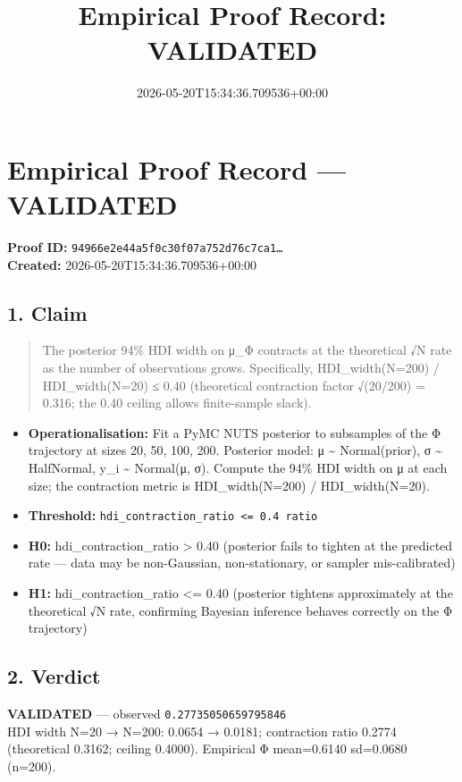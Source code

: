 \documentclass{article}
\title{Empirical Proof Record: VALIDATED}
\date{2026-05-20T15:34:36.709536+00:00}
\begin{document}
\maketitle
\section*{Empirical Proof Record --- \textcolor{validated}{\textbf{VALIDATED}}}
\textbf{Proof ID:} \texttt{94966e2e44a5f0c30f07a752d76c7ca1\dots}\\
\textbf{Created:} 2026-05-20T15:34:36.709536+00:00
\subsection*{1. Claim}
\begin{quote}The posterior 94\% HDI width on μ\_Φ contracts at the theoretical √N rate as the number of observations grows. Specifically, HDI\_width(N=200) / HDI\_width(N=20) ≤ 0.40 (theoretical contraction factor √(20/200) = 0.316; the 0.40 ceiling allows finite-sample slack).\end{quote}
\begin{itemize}
\item \textbf{Operationalisation:} Fit a PyMC NUTS posterior to subsamples of the Φ trajectory at sizes 20, 50, 100, 200. Posterior model: μ \textasciitilde{} Normal(prior), σ \textasciitilde{} HalfNormal, y\_i \textasciitilde{} Normal(μ, σ). Compute the 94\% HDI width on μ at each size; the contraction metric is HDI\_width(N=200) / HDI\_width(N=20).
\item \textbf{Threshold:} \texttt{hdi\_contraction\_ratio <= 0.4 ratio}
\item \textbf{H0:} hdi\_contraction\_ratio > 0.40 (posterior fails to tighten at the predicted rate — data may be non-Gaussian, non-stationary, or sampler mis-calibrated)
\item \textbf{H1:} hdi\_contraction\_ratio <= 0.40 (posterior tightens approximately at the theoretical √N rate, confirming Bayesian inference behaves correctly on the Φ trajectory)
\end{itemize}
\subsection*{2. Verdict}
\textcolor{validated}{\textbf{VALIDATED}} --- observed \texttt{0.27735050659795846}\\
HDI width N=20 → N=200: 0.0654 → 0.0181; contraction ratio 0.2774 (theoretical 0.3162; ceiling 0.4000). Empirical Φ mean=0.6140 sd=0.0680 (n=200).
\end{document}
